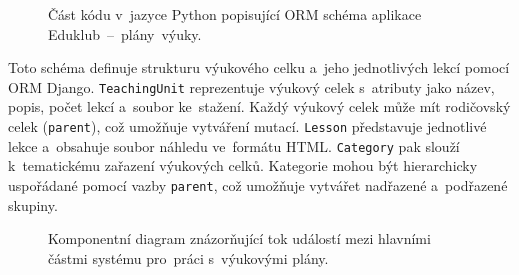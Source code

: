 \documentclass[male,czech,api_bc]{kitheses}
\begin{document}
\begin{figure}[H]
	\centering
	\caption{Část kódu v~jazyce Python popisující ORM schéma aplikace Eduklub~--~plány~výuky.}
	\label{fig:code-2}
\end{figure}

Toto schéma definuje strukturu výukového celku a~jeho jednotlivých lekcí pomocí ORM Django. \texttt{TeachingUnit} reprezentuje výukový celek s~atributy jako název, popis, počet lekcí a~soubor ke~stažení. Každý výukový celek může mít rodičovský celek (\texttt{parent}), což umožňuje vytváření mutací. \texttt{Lesson} představuje jednotlivé lekce a~obsahuje soubor náhledu ve~formátu HTML. \texttt{Category} pak slouží k~tematickému zařazení výukových celků. Kategorie mohou být hierarchicky uspořádané pomocí vazby \texttt{parent}, což umožňuje vytvářet nadřazené a~podřazené skupiny.

\begin{figure}[H]
	\centering
	\caption{Komponentní diagram znázorňující tok událostí mezi hlavními částmi systému pro~práci s~výukovými plány.}
	\label{fig:component-diagram}
\end{figure}
\end{document}
